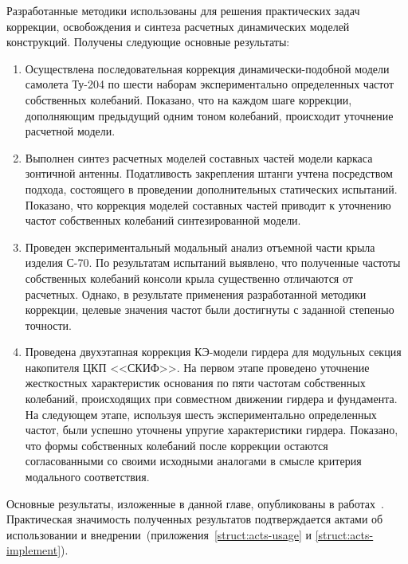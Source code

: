 Разработанные методики использованы для решения практических задач коррекции, освобождения и синтеза расчетных динамических моделей конструкций. Получены следующие основные результаты:
\begin{enumerate}
	\item Осуществлена последовательная коррекция динамически-подобной модели самолета Ту-204 по шести наборам экспериментально определенных частот собственных колебаний. Показано, что на каждом шаге коррекции, дополняющим предыдущий одним тоном колебаний, происходит уточнение расчетной модели.
	\item Выполнен синтез расчетных моделей составных частей модели каркаса зонтичной антенны. Податливость закрепления штанги учтена посредством подхода, состоящего в проведении дополнительных статических испытаний. Показано, что коррекция моделей составных частей приводит к уточнению частот собственных колебаний синтезированной модели.
	\item Проведен экспериментальный модальный анализ отъемной части крыла изделия С-70. По результатам испытаний выявлено, что полученные частоты собственных колебаний консоли крыла существенно отличаются от расчетных. Однако, в результате применения разработанной методики коррекции, целевые значения частот были достигнуты с заданной степенью точности. 
	\item Проведена двухэтапная коррекция КЭ-модели гирдера для модульных секция накопителя ЦКП <<СКИФ>>. На первом этапе проведено уточнение жесткостных характеристик основания по пяти частотам собственных колебаний, происходящих при совместном движении гирдера и фундамента. На следующем этапе, используя шесть экспериментально определенных частот, были успешно уточнены упругие характеристики гирдера. Показано, что формы собственных колебаний после коррекции остаются согласованными со своими исходными аналогами в смысле критерия модального соответствия.
\end{enumerate}

Основные результаты, изложенные в данной главе, опубликованы в работах~\cite{lib:author:chinese:updating, lib:author:iss2021:updating, lib:author:dvm:updating, lib:author:iss2022:updating}. Практическая значимость полученных результатов подтверждается актами об использовании и внедрении~(приложения~\ref{struct:acts-usage} и \ref{struct:acts-implement}).